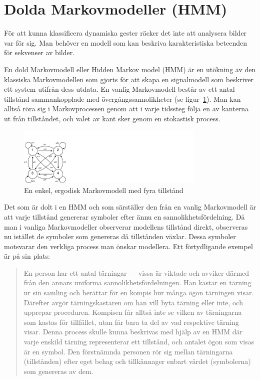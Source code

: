 \documentclass[../rapport_MVEX01-11-05]{subfiles}
\begin{document}
\section{Dolda Markovmodeller (HMM)}\label{sec:HMM}
För att kunna klassificera dynamiska gester räcker det inte att 
analysera bilder var för sig. Man behöver en modell som kan beskriva
karakteristiska beteenden för sekvenser av bilder.

En dold Markovmodell eller Hidden Markov model (HMM) är en utökning
av den klassiska Markovmodellen som gjorts för att skapa en
signalmodell som beskriver ett system utifrån dess utdata.
En vanlig Markovmodell består av ett antal tillstånd sammankopplade
med övergångssannolikheter (se figur~\ref{fig:hmm-ergodic}). Man kan alltså
röra sig i Markovprocessen genom att i varje tidssteg följa en av kanterna
ut från tillståndet, och valet av kant sker genom en stokastisk process.

\begin{figure}[tb]
  \centering
  \includegraphics[width=0.8\textwidth,trim=0 0 935 80,clip=true]{bilder/ergodicHMM}
  \caption{En enkel, ergodisk Markovmodell med fyra tillstånd}
  \label{fig:hmm-ergodic}
\end{figure}

Det som är dolt i en HMM och som särställer den från en vanlig Markovmodell
är att varje tillstånd genererar
symboler efter ännu en sannolikhetsfördelning. Då man i vanliga Markovmodeller
observerar modellens tillstånd direkt, observeras nu istället de
symboler som genereras då tillstånden växlar. Dessa symboler motsvarar
den verkliga process man önskar modellera. Ett förtydligande exempel
är på sin plats: 

\begin{quote}
En person har ett antal tärningar --- vissa är viktade och avviker därmed
från den annars uniforma sannolikhetsfördelningen.
Han kastar en tärning ur sin
samling och berättar för en kompis hur många ögon tärningen
visar. Därefter avgör tärningskastaren om han vill byta tärning eller
inte, och upprepar proceduren. Kompisen får alltså inte se vilken av
tärningarna som kastas för tillfället, utan får bara ta del av vad
respektive tärning visar. Denna process skulle kunna beskrivas med
hjälp av en HMM där varje enskild tärning representerar ett
tillstånd, och antalet ögon som visas är en symbol.
Den förstnämnda personen rör sig mellan tärningarna
(tillstånden) efter eget behag och tillkännager enbart värdet
(symbolerna) som genereras av dem. 
\end{quote}
\end{document}
